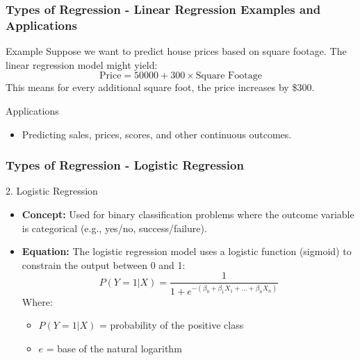\documentclass[aspectratio=169]{beamer}
\begin{document}
\begin{frame}[fragile]
\frametitle{Types of Regression - Linear Regression Examples and Applications}
\begin{block}{Example}
Suppose we want to predict house prices based on square footage. The linear regression model might yield:
\begin{equation}
\text{Price} = 50000 + 300 \times \text{Square Footage}
\end{equation}
This means for every additional square foot, the price increases by \$300.
\end{block}

\begin{block}{Applications}
\begin{itemize}
    \item Predicting sales, prices, scores, and other continuous outcomes.
\end{itemize}
\end{block}
\end{frame}

\begin{frame}[fragile]
\frametitle{Types of Regression - Logistic Regression}
\begin{block}{2. Logistic Regression}
\begin{itemize}
    \item \textbf{Concept:} Used for binary classification problems where the outcome variable is categorical (e.g., yes/no, success/failure).
    \item \textbf{Equation:} The logistic regression model uses a logistic function (sigmoid) to constrain the output between 0 and 1:
    \begin{equation}
    P(Y=1 | X) = \frac{1}{1 + e^{-(\beta_0 + \beta_1X_1 + ... + \beta_nX_n)}}
    \end{equation}
    Where:
    \begin{itemize}
        \item \(P(Y=1 | X)\) = probability of the positive class
        \item \(e\) = base of the natural logarithm
    \end{itemize}
\end{itemize}
\end{block}
\end{frame}
\end{document}
